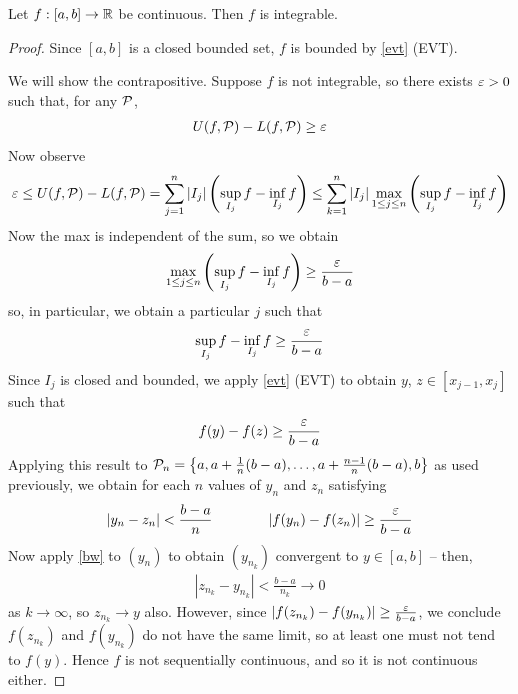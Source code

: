 \documentclass{../../template/note}
\begin{document}
    \begin{proposition}
        Let \(f: [a, b] \to \mathbb R\) be continuous. Then \(f\) is integrable.
    \end{proposition}
    
    \begin{proof}
        Since \([a, b]\) is a closed bounded set, \(f\) is bounded by \cref{evt} (EVT).
        
        We will show the contrapositive. Suppose \(f\) is not integrable, so there exists \(\varepsilon > 0\) such that, for any \(\mathcal{P}\),
        \begin{align*}
            U(f, \mathcal{P}) - L(f, \mathcal{P}) \geq \varepsilon
        \end{align*}
        Now observe
        \begin{align*}
            \varepsilon \leq U(f, \mathcal{P}) - L(f, \mathcal{P}) = \sum_{j=1}^n |I_j| \left(\sup_{I_j} f - \inf_{I_j} f\right) \leq \sum_{k=1}^n |I_j| \max_{1 \leq j \leq n} \left(\sup_{I_j} f - \inf_{I_j} f\right)
        \end{align*}
        Now the max is independent of the sum, so we obtain
        \begin{align*}
            \max_{1 \leq j \leq n} \left(\sup_{I_j} f - \inf_{I_j} f\right) \geq \frac{\varepsilon}{b-a}
        \end{align*}
        so, in particular, we obtain a particular \(j\) such that
        \begin{align*}
            \sup_{I_j} f - \inf_{I_j} f \geq \frac{\varepsilon}{b-a}
        \end{align*}
        Since \(I_j\) is closed and bounded, we apply \cref{evt} (EVT) to obtain \(y\), \(z \in [x_{j-1}, x_j]\) such that
        \begin{align*}
            f(y) - f(z) \geq \frac{\varepsilon}{b-a}
        \end{align*}
        Applying this result to \(\mathcal{P}_n = \left\{a, a + \frac 1 n (b-a), \dots, a + \frac{n-1}{n}(b-a), b\right\}\) as used previously, we obtain for each \(n\) values of \(y_n\) and \(z_n\) satisfying
        \begin{align*}
            |y_n - z_n| < \frac{b-a}{n} \qquad\qquad |f(y_n)-f(z_n)| \geq \frac{\varepsilon}{b-a}
        \end{align*}
        Now apply \cref{bw} to \((y_n)\) to obtain \((y_{n_k})\) convergent to \(y \in [a, b]\) -- then,
        \begin{align*}
            |z_{n_k}-y_{n_k}| < \frac{b-a}{n_k} \to 0
        \end{align*}
        as \(k \to \infty\), so \(z_{n_k} \to y\) also. However, since \(|f(z_{n_k})-f(y_{n_k})| \geq \frac{\varepsilon}{b-a}\), we conclude \(f(z_{n_k})\) and \(f(y_{n_k})\) do not have the same limit, so at least one must not tend to \(f(y)\). Hence \(f\) is not sequentially continuous, and so it is not continuous either.       
    \end{proof}
\end{document}
